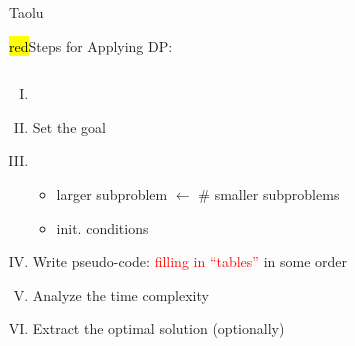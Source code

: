 
\begin{frame}{}
  \centerline{\Huge Taolu}
\end{frame}

\begin{frame}{}
  \centerline{\hl{red}{\Large Steps for Applying DP:}}

  \pause
  \vspace{0.30cm}
  \begin{columns}
      \begin{enumerate}[(I)]
	\setlength{\itemsep}{8pt}
	\item {}
	\item Set the goal
	\item {}
	  \begin{itemize}
	    \item larger subproblem $\gets$ \# smaller subproblems
	    \item init. conditions
	  \end{itemize}
	  \pause
	\item Write pseudo-code: \textcolor<4->{red}{filling in ``tables''} in some order
	\item Analyze the time complexity
	\item Extract the optimal solution (optionally)
      \end{enumerate}
  \end{columns}

\end{frame}
